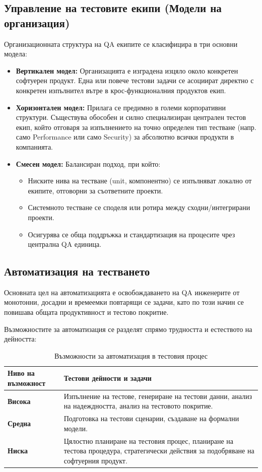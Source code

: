 \documentclass{scrartcl}
\begin{document}
\begin{FlushLeft}
\subsection{Управление на тестовите екипи (Модели на организация)}
Организационната структура на QA екипите се класифицира в три основни модела:
\begin{itemize}
    \item \textbf{Вертикален модел:} Организацията е изградена изцяло около конкретен софтуерен продукт. Една или повече тестови задачи се асоциират директно с конкретен изпълнител вътре в крос-функционалния продуктов екип.
    \item \textbf{Хоризонтален модел:} Прилага се предимно в големи корпоративни структури. Съществува обособен и силно специализиран централен тестов екип, който отговаря за изпълнението на точно определен тип тестване (напр. само Performance или само Security) за абсолютно всички продукти в компанията.
    \item \textbf{Смесен модел:} Балансиран подход, при който:
    \begin{itemize}
        \item Ниските нива на тестване (unit, компонентно) се изпълняват локално от екипите, отговорни за съответните проекти.
        \item Системното тестване се споделя или ротира между сходни/интегрирани проекти.
        \item Осигурява се обща поддръжка и стандартизация на процесите чрез централна QA единица.
    \end{itemize}
\end{itemize}

\subsection{Автоматизация на тестването}
Основната цел на автоматизацията е освобождаването на QA инженерите от монотонни, досадни и времеемки повтарящи се задачи, като по този начин се повишава общата продуктивност и тестово покритие. 

Възможностите за автоматизация се разделят спрямо трудността и естеството на дейността:
\begin{table}[h]
\centering
\caption{Възможности за автоматизация в тестовия процес}
\begin{tabularx}{\textwidth}{lX}
\toprule
\textbf{Ниво на възможност} & \textbf{Тестови дейности и задачи} \\ \midrule
\textbf{Висока} & Изпълнение на тестове, генериране на тестови данни, анализ на надеждността, анализ на тестовото покритие. \\ \addlinespace
\textbf{Средна} & Подготовка на тестови сценарии, създаване на формални модели. \\ \addlinespace
\textbf{Ниска} & Цялостно планиране на тестовия процес, планиране на тестова процедура, стратегически действия за подобряване на софтуерния продукт. \\ \bottomrule
\end{tabularx}
\end{table}


\end{FlushLeft}
\end{document}
